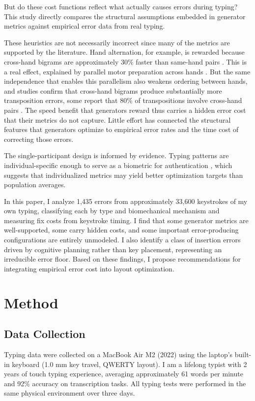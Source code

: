 \documentclass[12pt]{article}
\begin{document}
But do these cost functions reflect what actually causes errors during typing? This study directly compares the structural assumptions embedded in generator metrics against empirical error data from real typing.

These heuristics are not necessarily incorrect since many of the metrics are supported by the literature. Hand alternation, for example, is rewarded because cross-hand bigrams are approximately 30\% faster than same-hand pairs \citep{salthouse1986}. This is a real effect, explained by parallel motor preparation across hands \citep{john1996, wu2008}. But the same independence that enables this parallelism also weakens ordering between hands, and studies confirm that cross-hand bigrams produce substantially more transposition errors, some report that 80\% of transpositions involve cross-hand pairs \citep{grudin1983}. The speed benefit that generators reward thus carries a hidden error cost that their metrics do not capture. Little effort has connected the structural features that generators optimize to empirical error rates and the time cost of correcting those errors.

The single-participant design is informed by evidence. Typing patterns are individual-specific enough to serve as a biometric for authentication \citep{monrose2000}, which suggests that individualized metrics may yield better optimization targets than population averages.

In this paper, I analyze 1,435 errors from approximately 33,600 keystrokes of my own typing, classifying each by type and biomechanical mechanism and measuring fix costs from keystroke timing. I find that some generator metrics are well-supported, some carry hidden costs, and some important error-producing configurations are entirely unmodeled. I also identify a class of insertion errors driven by cognitive planning rather than key placement, representing an irreducible error floor. Based on these findings, I propose recommendations for integrating empirical error cost into layout optimization.

\section{Method}

\subsection{Data Collection}

Typing data were collected on a MacBook Air M2 (2022) using the laptop's built-in keyboard (1.0 mm key travel, QWERTY layout). I am a lifelong typist with 2 years of touch typing experience, averaging approximately 61 words per minute and 92\% accuracy on transcription tasks. All typing tests were performed in the same physical environment over three days.
\end{document}
